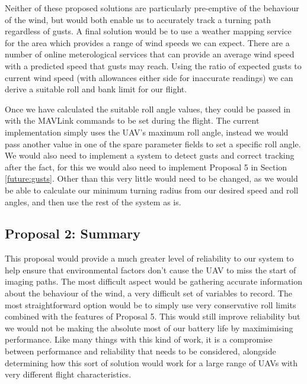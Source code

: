 Neither of these proposed solutions are particularly pre-emptive of the behaviour of the wind, but would both enable us to accurately track a turning path regardless of gusts. A final solution would be to use a weather mapping service for the area which provides a range of wind speeds we can expect. There are a number of online meterological services that can provide an average wind speed with a predicted speed that gusts may reach. Using the ratio of expected gusts to current wind speed (with allowances either side for inaccurate readings) we can derive a suitable roll and bank limit for our flight.

Once we have calculated the suitable roll angle values, they could be passed in with the MAVLink commands to be set during the flight. The current implementation simply uses the UAV's maximum roll angle, instead we would pass another value in one of the spare parameter fields to set a specific roll angle. We would also need to implement a system to detect gusts and correct tracking after the fact, for this we would also need to implement Proposal 5 in Section \ref{future:gusts}. Other than this very little would need to be changed, as we would be able to calculate our minimum turning radius from our desired speed and roll angles, and then use the rest of the system as is. 

\subsection{Proposal 2: Summary} 
\label{future:tolerancesummary}
This proposal would provide a much greater level of reliability to our system to help ensure that environmental factors don't cause the UAV to miss the start of imaging paths. The most difficult aspect would be gathering accurate information about the behaviour of the wind, a very difficult set of variables to record. The most straightforward option would be to simply use very conservative roll limits combined with the features of Proposal 5. This would still improve reliability but we would not be making the absolute most of our battery life by maximimising performance. Like many things with this kind of work, it is a compromise between performance and reliability that needs to be considered, alongside determining how this sort of solution would work for a large range of UAVs with very different flight characteristics. 

